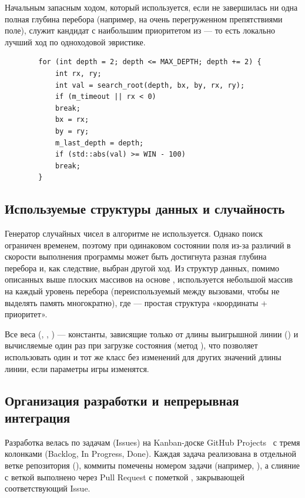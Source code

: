 \documentclass[14pt,a4paper]{extarticle}
\begin{document}
	Начальным запасным ходом, который используется, если не завершилась ни одна полная глубина перебора (например, на очень перегруженном препятствиями поле), служит кандидат с наибольшим приоритетом из  --- то есть локально лучший ход по одноходовой эвристике.
	
	\label{lst:iter}
	\begin{verbatim}
		for (int depth = 2; depth <= MAX_DEPTH; depth += 2) {
			int rx, ry;
			int val = search_root(depth, bx, by, rx, ry);
			if (m_timeout || rx < 0)
			break;
			bx = rx;
			by = ry;
			m_last_depth = depth;
			if (std::abs(val) >= WIN - 100)
			break;
		}
	\end{verbatim}
	
	\subsection{Используемые структуры данных и случайность}
	
	Генератор случайных чисел в алгоритме не используется. Однако поиск ограничен временем, поэтому при одинаковом состоянии поля из-за различий в скорости выполнения программы может быть достигнута разная глубина перебора и, как следствие, выбран другой ход. Из структур данных, помимо описанных выше плоских массивов на основе , используется небольшой массив  на каждый уровень перебора (переиспользуемый между вызовами, чтобы не выделять память многократно), где  --- простая структура «координаты + приоритет».
	
	Все веса (, , ) --- константы, зависящие только от длины выигрышной линии () и вычисляемые один раз при загрузке состояния (метод ), что позволяет использовать один и тот же класс без изменений для других значений длины линии, если параметры игры изменятся.
	
	\subsection{Организация разработки и непрерывная интеграция}\label{sec:ci}
	
	Разработка велась по задачам (Issues) на Kanban-доске GitHub Projects~\cite{ghprojects} с тремя колонками (Backlog, In Progress, Done). Каждая задача реализована в отдельной ветке репозитория (), коммиты помечены номером задачи (например, ), а слияние с веткой  выполнено через Pull Request с пометкой , закрывающей соответствующий Issue.
	
\end{document}
